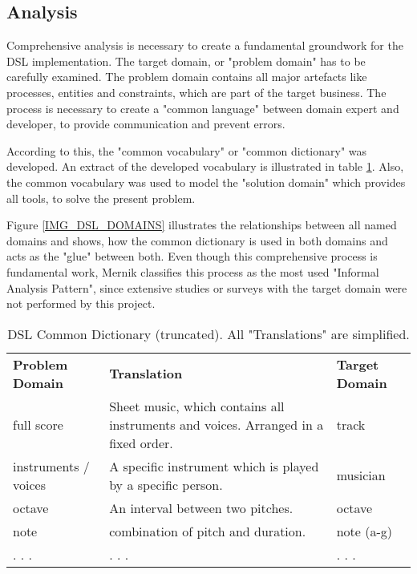 \subsection{Analysis}
\label{IMPL_SCALALA_ANALYSIS}
Comprehensive analysis is necessary to create a fundamental groundwork for the DSL implementation. The target domain, or "problem domain" has to be carefully examined. The problem domain contains all major artefacts like processes, entities and constraints, which are part of the target business. The process is necessary to create a "common language" between domain expert and developer, to provide communication and prevent errors.\cite{Ghosh2010}

According to this, the "common vocabulary"\cite{Ghosh2010} or "common dictionary"\cite{Riti2018} was developed. An extract of the developed vocabulary is illustrated in table \ref{TBL_COMMONDICT}. Also, the common vocabulary was used to model the "solution domain" which provides all tools, to solve the present problem.\cite{Ghosh2010, Riti2018}

Figure \ref{IMG_DSL_DOMAINS} illustrates the relationships between all named domains and shows, how the common dictionary is used in both domains and acts as the "glue" between both.\cite{Ghosh2010} Even though this comprehensive process is fundamental work, Mernik classifies this process as the most used "Informal Analysis Pattern", since extensive studies or surveys with the target domain were not performed by this project.\cite{Mernik2005}

\begin{table}[h]
\caption{DSL Common Dictionary (truncated). All "Translations" are simplified.}
\label{TBL_COMMONDICT}
\begin{tabular}{l|p{200pt}|l}
\rowcolor{htwg-teal} 
\textbf{Problem Domain}      & \textbf{Translation}		& \textbf{Target Domain}     \\
full score                  						& Sheet music, which contains all instruments and voices. Arranged in a fixed order. 		& track \\
instruments /  voices 					& A specific instrument which is played by a specific person.							& musician \\
octave 											& 	An interval between two pitches.																						& octave \\
note													& combination of pitch and duration.																						& note (a-g) \\
. . .													& . . . 																																			& . . .
\end{tabular}
\end{table}

